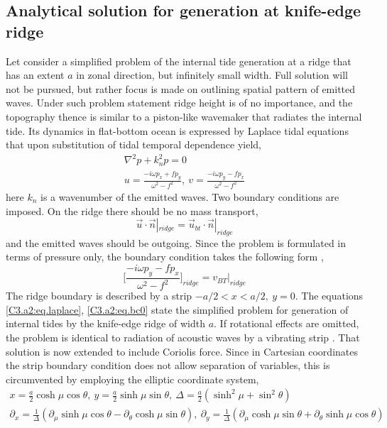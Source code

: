 \documentclass[12pt]{article}
\begin{document}
\renewcommand{\thesubsection}{\Alph{subsection}}
\setcounter{subsection}{0}
\subsection{Analytical solution for generation at knife-edge ridge}
Let consider a simplified problem of the internal tide generation at a ridge that has an 
extent $a$ in zonal direction, but infinitely small width. Full solution will not be pursued, but 
rather focus is made on outlining spatial pattern of emitted waves. Under such problem statement 
ridge height is of no importance, and the topography thence is similar to a piston-like 
wavemaker that radiates the internal tide. Its dynamics in flat-bottom ocean is expressed by 
Laplace tidal equations that upon substitution of tidal temporal dependence yield,
\begin{align}
\nabla^2 p + k_n^2 p = 0\\
u = \frac{-i \omega p_x + f p_y}{\omega^2 - f^2},~v = \frac{-i \omega p_y - f p_x}{\omega^2 - f^2}
\label{C3.a2:eq.laplace}
\end{align}
here $k_n$ is a wavenumber of the emitted waves. Two boundary conditions are imposed. 
On the ridge there should be no mass transport, 
\begin{equation}
\vec{u}\cdot \vec{n}|_{ridge} = \vec{u}_{bt} \cdot \vec{n} |_{ridge}
\end{equation}
and the emitted waves should be outgoing. Since the problem is formulated in terms of pressure 
only, the boundary condition takes the following form \citep{greenspan1968theory},
\begin{equation}
\Big[ \frac{-i \omega p_y - f p_x}{\omega^2 - f^2} \Big]_{ridge} = v_{BT}|_{ridge}
\label{C3.a2:eq.bc0}
\end{equation}
The ridge boundary is described by a strip $-a/2 < x < a/2,~y=0$. The equations 
\eqref{C3.a2:eq.laplace}, \eqref{C3.a2:eq.bc0} state the simplified problem for generation of 
internal tides by the knife-edge ridge of width $a$. If 
rotational effects are omitted, the problem is identical to 
radiation of acoustic waves by a vibrating strip \citep{morse1946methods}. That solution is now 
extended to include Coriolis force. Since in Cartesian coordinates the strip boundary condition 
does not allow separation of variables, this is circumvented by employing the elliptic coordinate 
system,
\begin{align*}
x = \frac{a}{2} \cosh \mu \cos \theta,~y = \frac{a}{2} \sinh \mu \sin \theta,~\Delta = \frac{a}{2} 
(\sinh^2 \mu + \sin^2 \theta)\\
\partial_x = 
\frac{1}{\Delta} (\partial_{\mu} \sinh \mu \cos \theta - \partial_{\theta} \cosh \mu 
\sin \theta),~\partial_y = \frac{1}{\Delta} (\partial_{\mu} \cosh \mu \sin \theta + 
\partial_{\theta} \sinh \mu \cos \theta)
\end{align*}
\end{document}

